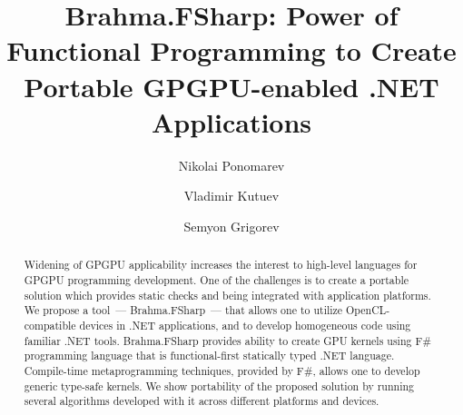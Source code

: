 \documentclass[runningheads]{llncs}
\begin{document}
%
\title{Brahma.FSharp: Power of Functional Programming to Create Portable GPGPU-enabled .NET Applications}
%
%
\author{Nikolai Ponomarev \and
Vladimir Kutuev \and
Semyon Grigorev}
%
%
%
\maketitle              %
%
\begin{abstract}
Widening of GPGPU applicability increases the interest to high-level languages for GPGPU programming development.
One of the challenges is to create a portable solution which provides static checks and being integrated with application platforms.
We propose a tool~--- Brahma.FSharp~--- that allows one to utilize OpenCL-compatible devices in .NET applications, and to develop homogeneous code using familiar .NET tools.
Brahma.FSharp provides ability to create GPU kernels using F\# programming language that is functional-first statically typed .NET language.
Compile-time metaprogramming techniques, provided by F\#, allows one to develop generic type-safe kernels.
We show portability of the proposed solution by running several algorithms developed with it across different platforms and devices.
    
\end{abstract}


%



%



\end{document}
